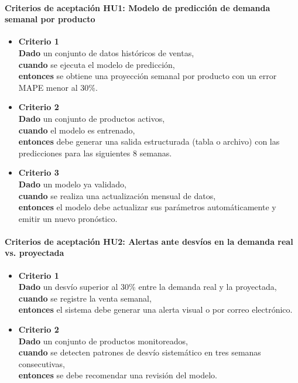 \documentclass[
11pt, %
]{charter}
\begin{document}
\paragraph{Criterios de aceptación HU1: Modelo de predicción de demanda semanal por producto}
\begin{itemize}
  \item \textbf{Criterio 1} \\
  \textbf{Dado} un conjunto de datos históricos de ventas, \\
  \textbf{cuando} se ejecuta el modelo de predicción, \\
  \textbf{entonces} se obtiene una proyección semanal por producto con un error MAPE menor al 30\%.

  \item \textbf{Criterio 2} \\
  \textbf{Dado} un conjunto de productos activos, \\
  \textbf{cuando} el modelo es entrenado, \\
  \textbf{entonces} debe generar una salida estructurada (tabla o archivo) con las predicciones para las siguientes 8 semanas.

  \item \textbf{Criterio 3} \\
  \textbf{Dado} un modelo ya validado, \\
  \textbf{cuando} se realiza una actualización mensual de datos, \\
  \textbf{entonces} el modelo debe actualizar sus parámetros automáticamente y emitir un nuevo pronóstico.
\end{itemize}

\vspace{1em}

\paragraph{Criterios de aceptación HU2: Alertas ante desvíos en la demanda real vs. proyectada}
\begin{itemize}
  \item \textbf{Criterio 1} \\
  \textbf{Dado} un desvío superior al 30\% entre la demanda real y la proyectada, \\
  \textbf{cuando} se registre la venta semanal, \\
  \textbf{entonces} el sistema debe generar una alerta visual o por correo electrónico.

  \item \textbf{Criterio 2} \\
  \textbf{Dado} un conjunto de productos monitoreados, \\
  \textbf{cuando} se detecten patrones de desvío sistemático en tres semanas consecutivas, \\
  \textbf{entonces} se debe recomendar una revisión del modelo.
\end{itemize}
\end{document}
